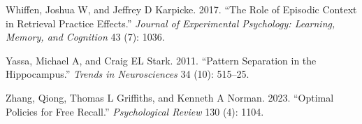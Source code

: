 \documentclass[
  letterpaper,
  11pt,
  english,
  singlespacing,
  headsepline]{MastersDoctoralThesis}
\newlength{\cslhangindent}
\newenvironment{CSLReferences}[2] %
 {\begin{list}{}{%
  \setlength{\itemindent}{0pt}
  \setlength{\leftmargin}{0pt}
  \setlength{\parsep}{0pt}
  \ifodd #1
   \setlength{\leftmargin}{\cslhangindent}
   \setlength{\itemindent}{-1\cslhangindent}
  \fi
  \setlength{\itemsep}{#2\baselineskip}}}
 {\end{list}}
\begin{document}
\begin{CSLReferences}{1}{0}
Whiffen, Joshua W, and Jeffrey D Karpicke. 2017. {``The Role of Episodic
Context in Retrieval Practice Effects.''} \emph{Journal of Experimental
Psychology: Learning, Memory, and Cognition} 43 (7): 1036.

Yassa, Michael A, and Craig EL Stark. 2011. {``Pattern Separation in the
Hippocampus.''} \emph{Trends in Neurosciences} 34 (10): 515--25.

Zhang, Qiong, Thomas L Griffiths, and Kenneth A Norman. 2023. {``Optimal
Policies for Free Recall.''} \emph{Psychological Review} 130 (4): 1104.

\end{CSLReferences}
\end{document}
